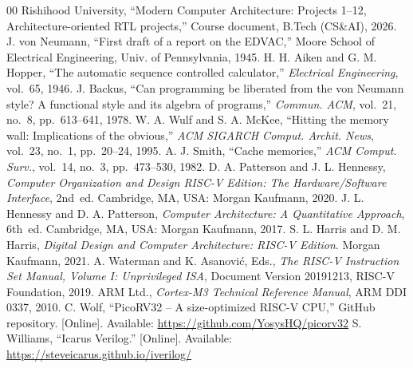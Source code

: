 \documentclass[conference]{IEEEtran}
\begin{document}
\begin{thebibliography}{00}
 Rishihood University, ``Modern Computer Architecture: Projects 1--12, Architecture-oriented RTL projects,'' Course document, B.Tech (CS\&AI), 2026.
 J. von Neumann, ``First draft of a report on the EDVAC,'' Moore School of Electrical Engineering, Univ. of Pennsylvania, 1945.
 H. H. Aiken and G. M. Hopper, ``The automatic sequence controlled calculator,'' \textit{Electrical Engineering}, vol.~65, 1946.
 J. Backus, ``Can programming be liberated from the von Neumann style? A functional style and its algebra of programs,'' \textit{Commun. ACM}, vol.~21, no.~8, pp.~613--641, 1978.
 W. A. Wulf and S. A. McKee, ``Hitting the memory wall: Implications of the obvious,'' \textit{ACM SIGARCH Comput. Archit. News}, vol.~23, no.~1, pp.~20--24, 1995.
 A. J. Smith, ``Cache memories,'' \textit{ACM Comput. Surv.}, vol.~14, no.~3, pp.~473--530, 1982.
 D. A. Patterson and J. L. Hennessy, \textit{Computer Organization and Design RISC-V Edition: The Hardware/Software Interface}, 2nd~ed. Cambridge, MA, USA: Morgan Kaufmann, 2020.
 J. L. Hennessy and D. A. Patterson, \textit{Computer Architecture: A Quantitative Approach}, 6th~ed. Cambridge, MA, USA: Morgan Kaufmann, 2017.
 S. L. Harris and D. M. Harris, \textit{Digital Design and Computer Architecture: RISC-V Edition}. Morgan Kaufmann, 2021.
 A. Waterman and K. Asanovi\'{c}, Eds., \textit{The RISC-V Instruction Set Manual, Volume I: Unprivileged ISA}, Document Version 20191213, RISC-V Foundation, 2019.
 ARM Ltd., \textit{Cortex-M3 Technical Reference Manual}, ARM DDI 0337, 2010.
 C. Wolf, ``PicoRV32 -- A size-optimized RISC-V CPU,'' GitHub repository. [Online]. Available: \url{https://github.com/YosysHQ/picorv32}
 S. Williams, ``Icarus Verilog.'' [Online]. Available: \url{https://steveicarus.github.io/iverilog/}
\end{thebibliography}
\end{document}
